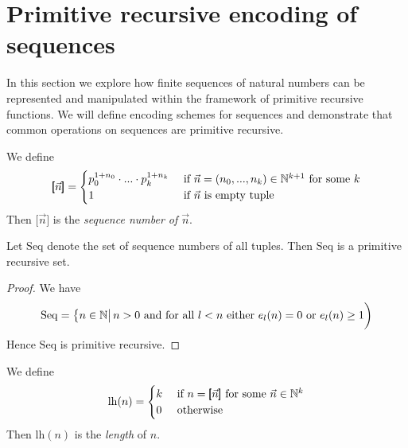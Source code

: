 \documentclass[10pt]{amsart}
\begin{document}
\section{Primitive recursive encoding of sequences}
\noindent
In this section we explore how finite sequences of natural numbers can be represented and manipulated within the framework of primitive recursive functions. We will define encoding schemes for sequences and demonstrate that common operations on sequences are primitive recursive.

\begin{definition}
	We define
	$$\pmb{[}\vec{n}\pmb{]} = \begin{cases}
			p_0^{1 + n_0}\cdot...\cdot p_{k}^{1 + n_k} & \mbox{ if }\vec{n} = \left(n_0,...,n_k\right)\in {\mathbb N}^{k + 1}\mbox{ for some }k \\
			1                                          & \mbox{ if }\vec{n}\mbox{ is empty tuple}                                       \\
		\end{cases}
	$$
	Then $\pmb{[}\vec{n}\pmb{]}$ is the \textit{sequence number of $\vec{n}$}.
\end{definition}

\begin{proposition}\label{proposition:tuple_codes_are_primitive_recursive}
	Let $\mathrm{Seq}$ denote the set of sequence numbers of all tuples. Then $\mathrm{Seq}$ is a primitive recursive set.
\end{proposition}
\begin{proof}
	We have
	$$\mathrm{Seq} = \big\{n \in {\mathbb N}\big|\,n > 0\mbox{ and for all }l < n\mbox{ either }e_l(n) = 0\mbox{ or }e_l(n) \geq 1\bigg)$$
	Hence $\mathrm{Seq}$ is primitive recursive.
\end{proof}

\begin{definition}
	We define
	$$\mathrm{lh}(n) = \begin{cases}
			k & \mbox{ if }n = \pmb{[}\vec{n}\pmb{]}\mbox{ for some }\vec{n} \in {\mathbb N}^k \\
			0 & \mbox{ otherwise }                                                     \\
		\end{cases}
	$$
	Then $\mathrm{lh}(n)$ is the \textit{length} of $n$.
\end{definition}
\end{document}
